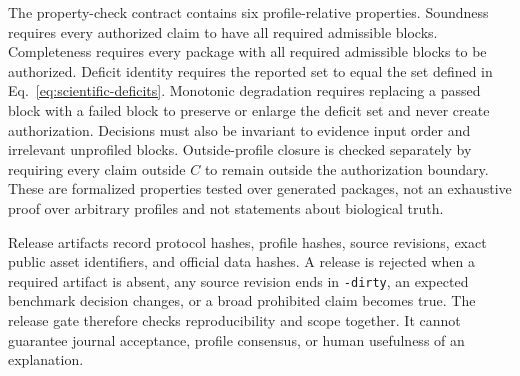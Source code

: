 The property-check contract contains six profile-relative properties. Soundness requires every authorized claim to have all required admissible blocks. Completeness requires every package with all required admissible blocks to be authorized. Deficit identity requires the reported set to equal the set defined in Eq.~\ref{eq:scientific-deficits}. Monotonic degradation requires replacing a passed block with a failed block to preserve or enlarge the deficit set and never create authorization. Decisions must also be invariant to evidence input order and irrelevant unprofiled blocks. Outside-profile closure is checked separately by requiring every claim outside $C$ to remain outside the authorization boundary. These are formalized properties tested over generated packages, not an exhaustive proof over arbitrary profiles and not statements about biological truth.

Release artifacts record protocol hashes, profile hashes, source revisions, exact public asset identifiers, and official data hashes. A release is rejected when a required artifact is absent, any source revision ends in \texttt{-dirty}, an expected benchmark decision changes, or a broad prohibited claim becomes true. The release gate therefore checks reproducibility and scope together. It cannot guarantee journal acceptance, profile consensus, or human usefulness of an explanation.
